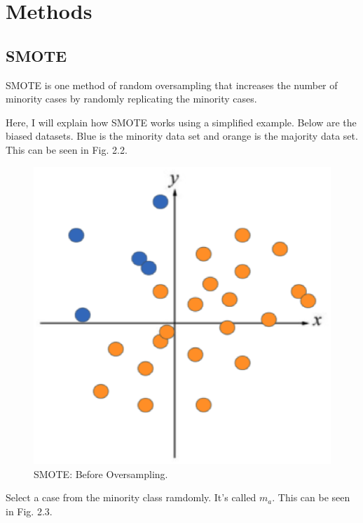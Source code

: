\section{Methods}
\subsection{SMOTE}
SMOTE is one method of random oversampling that increases the number of minority cases by randomly replicating the minority cases\cite{SMOTE}.

Here, I will explain how SMOTE works using a simplified example. Below are the biased datasets. Blue is the minority data set and orange is the majority data set. This can be seen in Fig. 2.2.

\begin{center}
    \begin{figure}[ht]
        \caption{SMOTE: Before Oversampling.}
        \label{tab:team-rating-features}
        \begin{center}
            \includegraphics[scale=0.6]{image/smote1.eps}
        \end{center}
    \end{figure}
\end{center}

\clearpage

Select a case from the minority class ramdomly. It's called $m_a$. This can be seen in Fig. 2.3.

